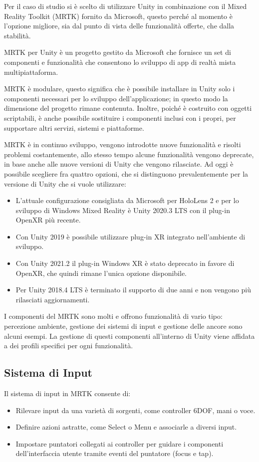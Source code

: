 Per il caso di studio si è scelto di utilizzare Unity in combinazione con il Mixed Reality Toolkit (MRTK) fornito da Microsoft, questo perché al momento è l'opzione migliore, sia dal punto di vista delle funzionalità offerte, che dalla stabilità.

MRTK per Unity è un progetto gestito da Microsoft che fornisce un set di componenti e funzionalità che consentono lo sviluppo di app di realtà mista multipiattaforma. 

MRTK è modulare, questo significa che è possibile installare in Unity solo i componenti necessari per lo sviluppo dell’applicazione; in questo modo la dimensione del progetto rimane contenuta. Inoltre, poiché è costruito con oggetti scriptabili, è anche possibile sostituire i componenti inclusi con i propri, per supportare altri servizi, sistemi e piattaforme. 

MRTK è in continuo sviluppo, vengono introdotte nuove funzionalità e risolti problemi costantemente, allo stesso tempo alcune funzionalità vengono deprecate, in base anche alle nuove versioni di Unity che vengono rilasciate. Ad oggi è possibile scegliere fra quattro opzioni, che si distinguono prevalentemente per la versione di Unity che si vuole utilizzare:

\begin{itemize}
\item L'attuale configurazione consigliata da Microsoft per HoloLens 2 e per lo sviluppo di Windows Mixed Reality è Unity 2020.3 LTS con il plug-in OpenXR più recente. 
\item Con Unity 2019 è possibile utilizzare plug-in XR integrato nell’ambiente di sviluppo. 
\item Con Unity 2021.2 il plug-in Windows XR è stato deprecato in favore di OpenXR, che quindi rimane l’unica opzione disponibile. 
\item Per Unity 2018.4 LTS è terminato il supporto di due anni e non vengono più rilasciati aggiornamenti.
\end{itemize}

I componenti del MRTK sono molti e offrono funzionalità di vario tipo: percezione ambiente, gestione dei sistemi di input e gestione delle ancore sono alcuni esempi.
La gestione di questi componenti all'interno di Unity viene affidata a dei profili specifici per ogni funzionalità.

\subsection{Sistema di Input}
Il sistema di input in MRTK consente di:
\begin{itemize}
    \item Rilevare input da una varietà di sorgenti, come controller 6DOF, mani o voce.
    \item Definire azioni astratte, come Select o Menu e associarle a diversi input.
    \item Impostare puntatori collegati ai controller per guidare i componenti dell'interfaccia utente tramite eventi del puntatore (focus e tap).
\end{itemize}

